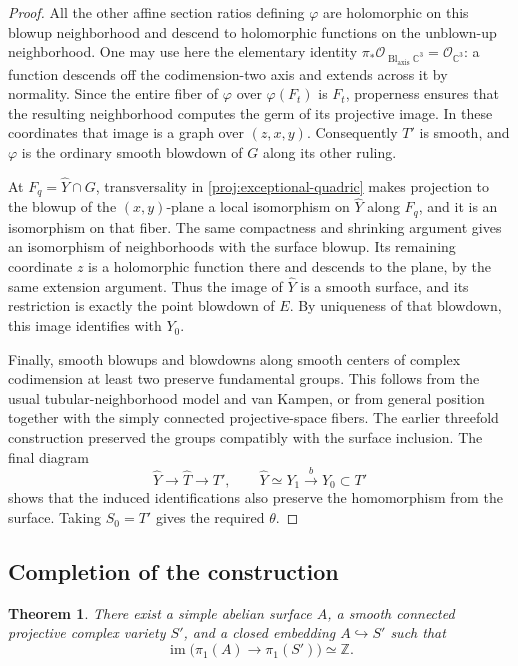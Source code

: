 \documentclass[11pt,reqno]{amsart}
\numberwithin{equation}{section}
\newtheorem{theorem}{Theorem}[section]
\theoremstyle{definition}
\theoremstyle{remark}
\begin{document}
\begin{proof}
All the other affine section ratios defining $\varphi$ are holomorphic
on this blowup neighborhood and descend to holomorphic functions on
the unblown-up neighborhood.  One may use here the elementary identity
$\pi_*\mathcal O_{\operatorname{Bl}_{\mathrm{axis}}\mathbb C^3}
=\mathcal O_{\mathbb C^3}$: a function descends off the codimension-two axis
and extends across it by normality.  Since the entire fiber of
$\varphi$ over $\varphi(F_t)$ is $F_t$, properness ensures that the
resulting neighborhood computes the germ of its projective image.
In these coordinates that image is a graph over $(z,x,y)$.
Consequently $T'$ is smooth, and $\varphi$ is the ordinary smooth
blowdown of $G$ along its other ruling.

At $F_q=\widehat Y\cap G$, transversality in
\eqref{proj:exceptional-quadric} makes projection to the blowup of the
$(x,y)$-plane a local isomorphism on $\widehat Y$ along $F_q$, and it
is an isomorphism on that fiber.  The same compactness and shrinking
argument gives an isomorphism of neighborhoods with the surface
blowup.  Its remaining coordinate $z$ is a holomorphic function there and
descends to the plane, by the same extension argument.  Thus the
image of $\widehat Y$ is a smooth surface, and its restriction is
exactly the point blowdown of $E$.  By uniqueness of that blowdown,
this image identifies with $Y_0$.

Finally, smooth blowups and blowdowns along smooth centers of complex
codimension at least two preserve fundamental groups.  This follows
from the usual tubular-neighborhood model and van Kampen, or from
general position together with the simply connected projective-space
fibers.  The earlier threefold construction preserved the groups
compatibly with the surface inclusion.  The final diagram
\[
 \widehat Y\longrightarrow\widehat T\longrightarrow T',
 \qquad \widehat Y\simeq Y_1\xrightarrow{b}Y_0\subset T'
\]
shows that the induced identifications also preserve the homomorphism
from the surface.  Taking $S_0=T'$ gives the required $\theta$.
\end{proof}

\subsection{Completion of the construction}

\begin{theorem}\label{thm:cyclic-embedding}
There exist a simple abelian surface $A$, a smooth connected projective
complex variety $S'$, and a closed embedding $A\hookrightarrow S'$
such that
\[
 \operatorname{im}\bigl(\pi_1(A)\longrightarrow\pi_1(S')\bigr)\simeq\mathbb Z.
\]
\end{theorem}
\end{document}
